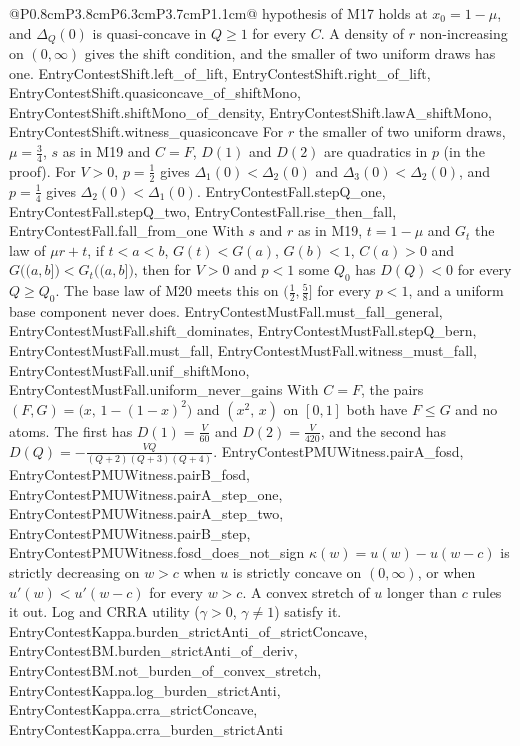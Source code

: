 \begin{longtable}{@{}P{0.8cm}P{3.8cm}P{6.3cm}P{3.7cm}P{1.1cm}@{}}
{  hypothesis of M17 holds at $x_0=1-\mu$, and $\Delta_Q(0)$ is quasi-concave in
  $Q\ge1$ for every $C$. A density of $r$ non-increasing on $(0,\infty)$ gives
  the shift condition, and the smaller of two uniform draws has one.}
  {EntryContestShift.left_of_lift, EntryContestShift.right_of_lift, EntryContestShift.quasiconcave_of_shiftMono, EntryContestShift.shiftMono_of_density, EntryContestShift.lawA_shiftMono, EntryContestShift.witness_quasiconcave}
  {For $r$ the smaller of two uniform draws, $\mu=\frac34$, $s$ as in M19 and
  $C=F$, $D(1)$ and $D(2)$ are quadratics in $p$ (in the proof). For $V>0$,
  $p=\frac12$ gives $\Delta_1(0)<\Delta_2(0)$ and $\Delta_3(0)<\Delta_2(0)$, and
  $p=\frac14$ gives $\Delta_2(0)<\Delta_1(0)$.}
  {EntryContestFall.stepQ_one, EntryContestFall.stepQ_two, EntryContestFall.rise_then_fall, EntryContestFall.fall_from_one}
  {With $s$ and $r$ as in M19, $t=1-\mu$ and $G_t$ the law of $\mu r+t$, if
  $t<a<b$, $G(t)<G(a)$, $G(b)<1$, $C(a)>0$ and $G\big((a,b]\big)<G_t\big((a,b]\big)$,
  then for $V>0$ and $p<1$ some $Q_0$ has $D(Q)<0$ for every $Q\ge Q_0$. The base
  law of M20 meets this on $(\frac12,\frac58]$ for every $p<1$, and a uniform
  base component never does.}
  {EntryContestMustFall.must_fall_general, EntryContestMustFall.shift_dominates, EntryContestMustFall.stepQ_bern, EntryContestMustFall.must_fall, EntryContestMustFall.witness_must_fall, EntryContestMustFall.unif_shiftMono, EntryContestMustFall.uniform_never_gains}
  {With $C=F$, the pairs $(F,G)=\big(x,\,1-(1-x)^2\big)$ and $(x^2,\,x)$ on
  $[0,1]$ both have $F\le G$ and no atoms. The first has $D(1)=\frac V{60}$ and
  $D(2)=\frac V{420}$, and the second has $D(Q)=-\frac{VQ}{(Q+2)(Q+3)(Q+4)}$.}
  {EntryContestPMUWitness.pairA_fosd, EntryContestPMUWitness.pairB_fosd, EntryContestPMUWitness.pairA_step_one, EntryContestPMUWitness.pairA_step_two, EntryContestPMUWitness.pairB_step, EntryContestPMUWitness.fosd_does_not_sign}
  {$\kappa(w)=u(w)-u(w-c)$ is strictly decreasing on $w>c$ when $u$ is strictly
  concave on $(0,\infty)$, or when $u'(w)<u'(w-c)$ for every $w>c$. A convex
  stretch of $u$ longer than $c$ rules it out. Log and CRRA utility ($\gamma>0$,
  $\gamma\ne1$) satisfy it.}
  {EntryContestKappa.burden_strictAnti_of_strictConcave, EntryContestBM.burden_strictAnti_of_deriv, EntryContestBM.not_burden_of_convex_stretch, EntryContestKappa.log_burden_strictAnti, EntryContestKappa.crra_strictConcave, EntryContestKappa.crra_burden_strictAnti}

\end{longtable}
